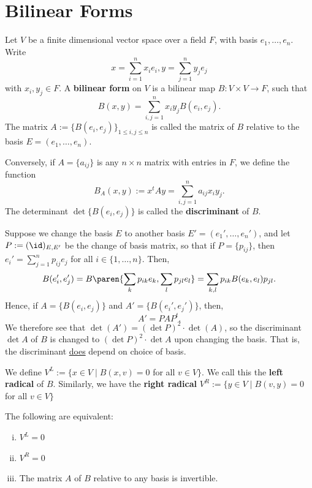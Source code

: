 \section{Bilinear Forms}

\begin{defn}
    Let $V$ be a finite dimensional vector space over a field $F$, with basis $e_1,\dots,e_n$. Write
    $$x = \sum_{i=1}^nx_ie_i,y=\sum_{j=1}^ny_je_j$$
    with $x_i,y_j \in F$. A \textbf{bilinear form} on $V$ is a bilinear map $B:V \times V \to F$, such that
    $$B(x,y) = \sum_{i,j=1}^n x_iy_jB(e_i,e_j).$$
    The matrix $A:= \{ B(e_i,e_j)\}_{1\leq i , j \leq n}$ is called the matrix of $B$ relative to the basis $E = (e_1,\dots,e_n)$.

    Conversely, if $A= \{a_{ij}\}$ is any $n \times n$ matrix with entries in $F$, we define the function
    $$B_A(x,y):= x^tAy = \sum_{i,j=1}^na_{ij}x_iy_j.$$
    The determinant $\det \{B(e_i,e_j)\}$ is called the \textbf{discriminant} of $B$.
\end{defn}

Suppose we change the basis $E$ to another basis $E' = (e_1',\dots,e_n')$, and let $P:= (\id )_{E ,E'}$ be the change of basis matrix, so that if $P = \{p_{ij}\}$, then $e_i' = \sum_{j=1}^n p_{ij}e_j$ for all $i \in \{1,\dots,n\}$. Then,
\begin{align*}
    B(e_i',e_j') = B\paren{\sum_kp_{ik}e_k,\sum_l
p_{jl}e_l}= \sum_{k,l} p_{ik}B(e_k,e_l) p_{jl}.
\end{align*}
Hence, if $A = \{B(e_i,e_j)\}$ and $A'=\{B(e_i',e_j')\}$, then,
$$A'=PAP^t.$$
We therefore see that $\det (A')= (\det P)^2 \cdot \det (A)$, so the discriminant $\det A$ of $B$ is changed to $(\det P)^2 \cdot \det A$ upon changing the basis. That is, the discriminant \underline{does} depend on choice of basis.

\begin{defn}
    We define $V^L:= \{ x \in V \mid B(x,v)=0$ for all $v \in V \}$. We call this the \textbf{left radical} of $B$. Similarly, we have the \textbf{right radical} $V^R:= \{ y \in V \mid B(v,y)=0$ for all $v \in V \}$
\end{defn}

\begin{thm}
    The following are equivalent:
    \begin{enumerate}[(i)]
        \item $V^L=0$
        \item $V^R=0$
        \item The matrix $A$ of $B$ relative to any basis is invertible.
    \end{enumerate}
\end{thm}

